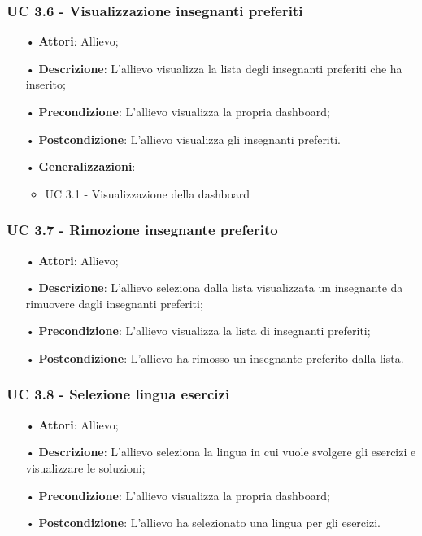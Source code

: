 \subsubsection{UC 3.6 - Visualizzazione insegnanti preferiti}
\begin{itemize}
	\item[•]\textbf{Attori}: Allievo;
	\item[•]\textbf{Descrizione}: L'allievo visualizza la lista degli insegnanti preferiti che ha inserito;
	\item[•]\textbf{Precondizione}: L'allievo visualizza la propria dashboard;
	\item[•]\textbf{Postcondizione}: L'allievo visualizza gli insegnanti preferiti.
	\item[•]\textbf{Generalizzazioni}:
\begin{itemize}
\item UC 3.1 - Visualizzazione della dashboard
\end{itemize}
\end{itemize}

\subsubsection{UC 3.7 - Rimozione insegnante preferito}
\begin{itemize}
	\item[•]\textbf{Attori}: Allievo;
	\item[•]\textbf{Descrizione}: L'allievo seleziona dalla lista visualizzata un insegnante da rimuovere dagli insegnanti preferiti;
	\item[•]\textbf{Precondizione}: L'allievo visualizza la lista di insegnanti preferiti;
	\item[•]\textbf{Postcondizione}: L'allievo ha rimosso un insegnante preferito dalla lista.
\end{itemize}

\subsubsection{UC 3.8 - Selezione lingua esercizi}
\begin{itemize}
	\item[•]\textbf{Attori}: Allievo;
	\item[•]\textbf{Descrizione}: L'allievo seleziona la lingua in cui vuole svolgere gli esercizi e visualizzare le soluzioni;
	\item[•]\textbf{Precondizione}: L'allievo visualizza la propria dashboard;
	\item[•]\textbf{Postcondizione}: L'allievo ha selezionato una lingua per gli esercizi.
\end{itemize}

